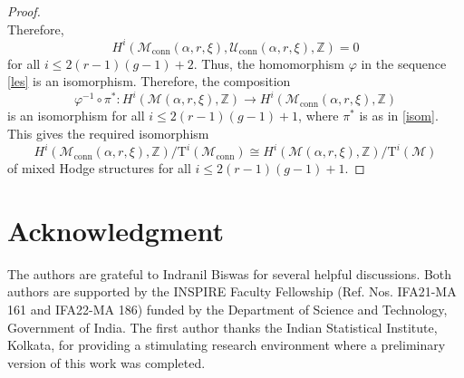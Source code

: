 \documentclass[11pt, reqno]{amsart}
\numberwithin{equation}{section}
\theoremstyle{definition}
\begin{document}
\begin{proof}
\[\]
Therefore,
\[
H^i(\mathcal{M}_{\mathrm{conn}}(\alpha, r, \xi), \mathcal{U}_{\mathrm{conn}}(\alpha, r, \xi), \mathbb{Z}) = 0
\]
for all $i \leq 2(r-1)(g-1) +2$. Thus, the homomorphism $\varphi$ in the sequence \eqref{les} is an isomorphism. Therefore, the composition
\[
\varphi^{-1} \circ \pi^* : H^i(\mathcal{M}(\alpha, r, \xi), \mathbb{Z}) \longrightarrow H^i(\mathcal{M}_{\mathrm{conn}}(\alpha, r, \xi), \mathbb{Z})
\]
is an isomorphism for all $i\leq 2(r-1)(g-1) +1$, where $\pi^*$ is as in \eqref{isom}. This gives the required isomorphism
\[
H^i(\mathcal{M}_{\mathrm{conn}}(\alpha, r, \xi),\mathbb{Z})/\mathrm{T}^i(\mathcal{M}_{\mathrm{conn}}) \cong H^i(\mathcal{M}(\alpha, r, \xi),\mathbb{Z})/\mathrm{T}^i(\mathcal{M})
\]
of mixed Hodge structures for all $i\leq 2(r-1)(g-1) +1$. 
\end{proof}


\section*{Acknowledgment}
The authors are grateful to Indranil Biswas for several helpful discussions. Both authors are supported by the INSPIRE Faculty Fellowship (Ref. Nos. IFA21-MA 161 and IFA22-MA 186) funded by the Department of Science and Technology, Government of India. The first author thanks the Indian Statistical Institute, Kolkata, for providing a stimulating research environment where a preliminary version of this work was completed.

	
 
	
	
\end{document}
